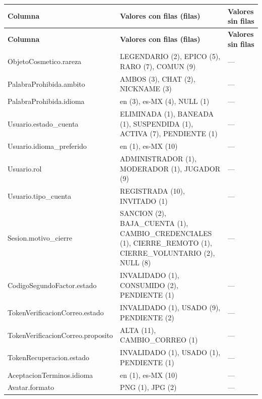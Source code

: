 \begin{center}\footnotesize\setlength{\tabcolsep}{2pt}
\begin{longtable}{|L{143.2pt}|L{159.3pt}|L{155.2pt}|}
\hline
\textbf{\hspace{0pt}Columna} & \textbf{\hspace{0pt}Valores con filas (filas)} & \textbf{\hspace{0pt}Valores sin filas} \\ \hline
\endfirsthead
\hline
\textbf{\hspace{0pt}Columna} & \textbf{\hspace{0pt}Valores con filas (filas)} & \textbf{\hspace{0pt}Valores sin filas} \\ \hline
\endhead
ObjetoCosmetico.rareza & LEGENDARIO (2), EPICO (5), RARO (7), COMUN (9) & — \\ \hline
PalabraProhibida.ambito & AMBOS (3), CHAT (2), NICKNAME (3) & — \\ \hline
PalabraProhibida.idioma & en (3), es-MX (4), NULL (1) & — \\ \hline
Usuario.estado\_\allowbreak{}cuenta & ELIMINADA (1), BANEADA (1), SUSPENDIDA (1), ACTIVA (7), PENDIENTE (1) & — \\ \hline
Usuario.idioma\_\allowbreak{}preferido & en (1), es-MX (10) & — \\ \hline
Usuario.rol & ADMINISTRADOR (1), MODERADOR (1), JUGADOR (9) & — \\ \hline
Usuario.tipo\_\allowbreak{}cuenta & REGISTRADA (10), INVITADO (1) & — \\ \hline
Sesion.motivo\_\allowbreak{}cierre & SANCION (2), BAJA\_\allowbreak{}CUENTA (1), CAMBIO\_\allowbreak{}CREDENCIALES (1), CIERRE\_\allowbreak{}REMOTO (1), CIERRE\_\allowbreak{}VOLUNTARIO (2), NULL (8) & — \\ \hline
CodigoSegundoFactor.estado & INVALIDADO (1), CONSUMIDO (2), PENDIENTE (1) & — \\ \hline
TokenVerificacionCorreo.estado & INVALIDADO (1), USADO (9), PENDIENTE (2) & — \\ \hline
TokenVerificacionCorreo.proposito & ALTA (11), CAMBIO\_\allowbreak{}CORREO (1) & — \\ \hline
TokenRecuperacion.estado & INVALIDADO (1), USADO (1), PENDIENTE (1) & — \\ \hline
AceptacionTerminos.idioma & en (1), es-MX (10) & — \\ \hline
Avatar.formato & PNG (1), JPG (2) & — \\ \hline

\end{longtable}
\end{center}
